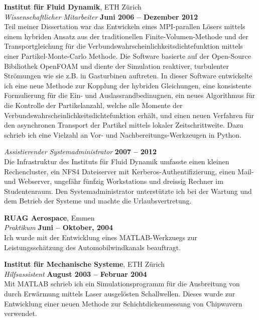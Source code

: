 \documentclass[line,11pt,a4paper]{../resume}
\begin{document}
\begin{resume}
\textbf{Institut für Fluid Dynamik}, ETH Zürich \vspace{2mm}\\\vspace{1mm}%
\textsl{Wissenschaftlicher Mitarbeiter} \hfill \textbf{Juni 2006 -- Dezember 2012}\\
Teil meiner Dissertation war das Entwickeln eines MPI-parallen Lösers mittels
einem hybriden Ansatz aus der traditionellen Finite-Volumen-Methode und der
Transportgleichung für die Verbundswahrscheinlichkeitsdichtefunktion mittels
einer Partikel-Monte-Carlo Methode. Die Software basierte auf der Open-Source
Bibiliothek OpenFOAM und diente der Simulation reaktiver, turbulenter
Strömungen wie sie z.B. in Gasturbinen auftreten. In dieser Software
entwickelte ich eine neue Methode zur Kopplung der hybriden Gleichungen, eine
konsistente Formulierung für die Ein- und Auslassrandbedinugnen, ein neues
Algorithmus für die Kontrolle der Partikelanzahl, welche alle Momente der
Verbundswahrscheinlichkeitsdichtefunktion erhält, und einen neuen Verfahren
für den asynchronen Transport der Partikel mittels lokaler Zeitschrittweite.
Dazu schrieb ich eine Vielzahl an Vor- und Nachbereitungs-Werkzeugen in
Python.

\textsl{Assistierender Systemadministrator} \hfill \textbf{2007 -- 2012}\\
Die Infrastruktur des Instituts für Fluid Dynamik umfasste einen kleinen
Rechencluster, ein NFS4 Dateiserver mit Kerberos-Authentifizierung, einen
Mail- und Webserver, ungefähr fünfzig Workstations und dreissig Rechner
im Studentenraum. Den Systemadministrator unterstützte ich bei der
Wartung und dem Betrieb der Systeme und machte die Urlaubsvertretung.

\textbf{RUAG Aerospace}, Emmen \vspace{2mm}\\\vspace{1mm}%
\textsl{Praktikum} \hfill \textbf{Juni -- Oktober, 2004}\\
Ich wurde mit der Entwicklung eines MATLAB-Werkzuegs zur Leistungsschätzung
des Automobilwindkanals beauftragt.

\textbf{Institut für Mechanische Systeme}, ETH Zürich \vspace{2mm}\\\vspace{1mm}%
\textsl{Hilfsassistent} \hfill \textbf{August 2003 -- Februar 2004}\\
Mit MATLAB schrieb ich ein Simulationsprogramm für die Ausbreitung von
durch Erwärmung mittels Laser ausgelösten Schallwellen. Dieses wurde zur
Entwicklung einer neuen Methode zur Schichtdickenmessung von Chipwavern
verwendet.


\end{resume}
\end{document}
